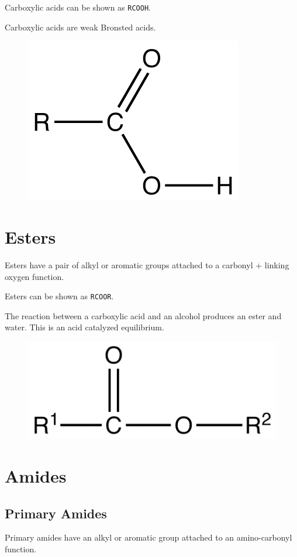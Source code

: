 \documentclass[oneside]{book} %
\theoremstyle{plain}
\begin{document}
Carboxylic acids can be shown as \texttt{RCOOH}.

Carboxylic acids are weak Bronsted acids.

\begin{figure}[ht]
\includegraphics{carboxylic_acid.png}
\centering
\end{figure}

\section{Esters}
Esters have a pair of alkyl or aromatic groups attached to a carbonyl + linking
oxygen function.

Esters can be shown as \texttt{RCOOR}.

The reaction between a carboxylic acid and an alcohol produces an ester and
water.
This is an acid catalyzed equilibrium.

\begin{figure}[ht]
\includegraphics{ester.png}
\centering
\end{figure}

\section{Amides}
\subsection{Primary Amides}
Primary amides have an alkyl or aromatic group attached to an amino-carbonyl
function.
\end{document}
